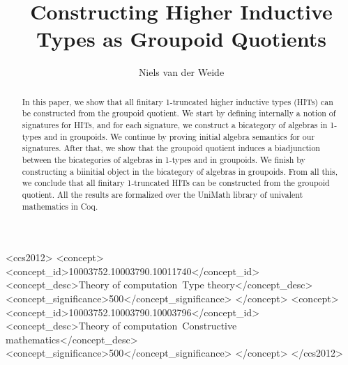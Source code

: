 \documentclass[screen]{acmart}
\theoremstyle{plain}
\theoremstyle{definition}
\begin{document}
	
\lstset{language=Coq}

\title{Constructing Higher Inductive Types as Groupoid Quotients}


\author{Niels van der Weide}

\begin{abstract}
	In this paper, we show that all finitary 1-truncated higher inductive types (HITs) can be constructed from the groupoid quotient.
	We start by defining internally a notion of signatures for HITs,
	and for each signature, we construct a bicategory of algebras in 1-types and in groupoids.
	We continue by proving initial algebra semantics for our signatures.
	After that, we show that the groupoid quotient induces a biadjunction between the bicategories of algebras in 1-types and in groupoids.
	We finish by constructing a biinitial object in the bicategory of algebras in groupoids.
	From all this, we conclude that all finitary 1-truncated HITs can be constructed from the groupoid quotient. 
	All the results are formalized over the UniMath library of univalent mathematics in Coq.
\end{abstract}

\begin{CCSXML}
	<ccs2012>
	<concept>
	<concept_id>10003752.10003790.10011740</concept_id>
	<concept_desc>Theory of computation~Type theory</concept_desc>
	<concept_significance>500</concept_significance>
	</concept>
	<concept>
	<concept_id>10003752.10003790.10003796</concept_id>
	<concept_desc>Theory of computation~Constructive mathematics</concept_desc>
	<concept_significance>500</concept_significance>
	</concept>
	</ccs2012>
\end{CCSXML}
\end{document}
